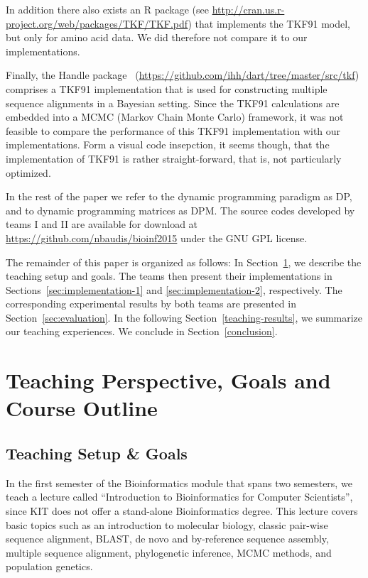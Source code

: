 \documentclass[runningheads,a4paper]{llncs}
\begin{document}
In addition there also exists an R package (see \url{http://cran.us.r-project.org/web/packages/TKF/TKF.pdf}) that implements the TKF91 model, but only for amino acid data.
We did therefore not compare it to our implementations.

Finally, the Handle package~\cite{holmes2001evolutionary} (\url{https://github.com/ihh/dart/tree/master/src/tkf}) comprises a TKF91 implementation that is 
used for constructing multiple sequence alignments in a Bayesian setting. Since the TKF91 calculations are embedded into a MCMC (Markov Chain Monte Carlo) framework, 
it was not feasible to compare the performance of this TKF91 implementation with our implementations. Form a visual code insepction, it seems though, 
that the implementation of TKF91 is rather straight-forward, that is, not particularly optimized.

In the rest of the paper we refer to the dynamic programming paradigm as DP, and to dynamic programming matrices as DPM.
The source codes developed by teams I and II are available for download at \url{https://github.com/nbaudis/bioinf2015} under the GNU GPL license.

The remainder of this paper is organized as follows: In Section~\ref{teaching}, we describe the teaching setup and goals.
The teams then present their implementations in Sections~\ref{sec:implementation-1} and \ref{sec:implementation-2}, respectively.
The corresponding experimental results by both teams are presented in Section~\ref{sec:evaluation}.
In the following Section~\ref{teaching-results}, we summarize our teaching experiences.
We conclude in Section~\ref{conclusion}.

\section{Teaching Perspective, Goals and Course Outline}
\label{teaching}

\subsection{Teaching Setup \& Goals}
\label{setup}

In the first semester of the Bioinformatics module that spans two semesters, 
we teach a lecture called ``Introduction to Bioinformatics for Computer Scientists'', since KIT does not offer
a stand-alone Bioinformatics degree. This lecture covers basic topics such as an introduction to molecular biology, classic pair-wise sequence alignment,
BLAST, de novo and by-reference sequence assembly, multiple sequence alignment, phylogenetic inference, MCMC methods, and population genetics.
\end{document}
